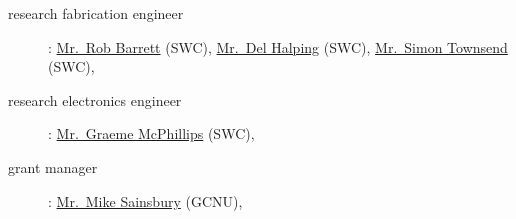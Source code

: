 \begin{description}
    \item[research fabrication engineer]:
        \href{https://www.sainsburywellcome.org/web/people/robb-barrett}{Mr.~Rob Barrett} (SWC), 
        \href{https://www.sainsburywellcome.org/web/people/del-halpin}{Mr.~Del Halping} (SWC), 
        \href{https://www.sainsburywellcome.org/web/people/simon-townsend}{Mr.~Simon Townsend} (SWC), 

    \item[research electronics engineer]:
        \href{https://www.sainsburywellcome.org/web/people/graeme-mcphillips}{Mr.~Graeme
        McPhillips} (SWC), 

    \item[grant manager]:
        \href{https://www.ucl.ac.uk/gatsby/people}{Mr.~Mike Sainsbury} (GCNU),

\end{description}

